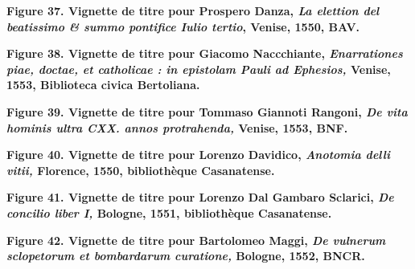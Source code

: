 \documentclass[12pt,twoside,openany]{book}
\begin{document}
\begin{center}
\par\small \textbf{Figure 37. Vignette de titre pour Prospero Danza, \textit{La elettion del beatissimo \& summo pontifice Iulio tertio}, Venise, 1550, BAV.}
\end{center}

\begin{center}
\par\small \textbf{Figure 38. Vignette de titre pour Giacomo Naccchiante, \textit{Enarrationes piae, doctae, et catholicae : in epistolam Pauli ad Ephesios, }Venise, 1553, Biblioteca civica Bertoliana.}
\end{center}

\begin{center}
\par\small \textbf{Figure 39. Vignette de titre pour Tommaso Giannoti Rangoni, \textit{De vita hominis ultra CXX. annos protrahenda, }Venise, 1553, BNF.}
\end{center}

\begin{center}
\par\small \textbf{Figure 40. Vignette de titre pour Lorenzo Davidico, \textit{Anotomia delli vitii, }Florence, 1550, bibliothèque Casanatense.}
\end{center}

\begin{center}
\par\small \textbf{Figure 41. Vignette de titre pour Lorenzo Dal Gambaro Sclarici, \textit{De concilio liber I, }Bologne, 1551, bibliothèque Casanatense.}
\end{center}

\begin{center}
\par\small \textbf{Figure 42. Vignette de titre pour Bartolomeo Maggi, \textit{De vulnerum sclopetorum et bombardarum curatione, }Bologne, 1552, BNCR.}
\end{center}
\end{document}
